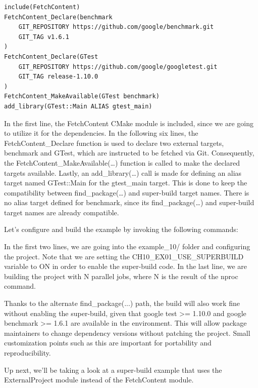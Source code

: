 \begin{lstlisting}[style=styleCMake]
include(FetchContent)
FetchContent_Declare(benchmark
	GIT_REPOSITORY https://github.com/google/benchmark.git
	GIT_TAG v1.6.1
)
FetchContent_Declare(GTest
	GIT_REPOSITORY https://github.com/google/googletest.git
	GIT_TAG release-1.10.0
)
FetchContent_MakeAvailable(GTest benchmark)
add_library(GTest::Main ALIAS gtest_main)
\end{lstlisting}

In the first line, the FetchContent CMake module is included, since we are going to utilize it for the dependencies. In the following six lines, the FetchContent\_Declare function is used to declare two external targets, benchmark and GTest, which are instructed to be fetched via Git. Consequently, the FetchContent\_MakeAvailable(…) function is called to make the declared targets available. Lastly, an add\_library(…) call is made for defining an alias target named GTest::Main for the gtest\_main target. This is done to keep the compatibility between find\_package(…) and super-build target names. There is no alias target defined for benchmark, since its find\_package(…) and super-build target names are already compatible.

Let's configure and build the example by invoking the following commands:


In the first two lines, we are going into the example\_10/ folder and configuring the project. Note that we are setting the CH10\_EX01\_USE\_SUPERBUILD variable to ON in order to enable the super-build code. In the last line, we are building the project with N parallel jobs, where N is the result of the nproc command.
 
Thanks to the alternate find\_package(...) path, the build will also work fine without enabling the super-build, given that google test >= 1.10.0 and google benchmark >= 1.6.1 are available in the environment. This will allow package maintainers to change dependency versions without patching the project. Small customization points such as this are important for portability and reproducibility.

Up next, we'll be taking a look at a super-build example that uses the ExternalProject module instead of the FetchContent module.

